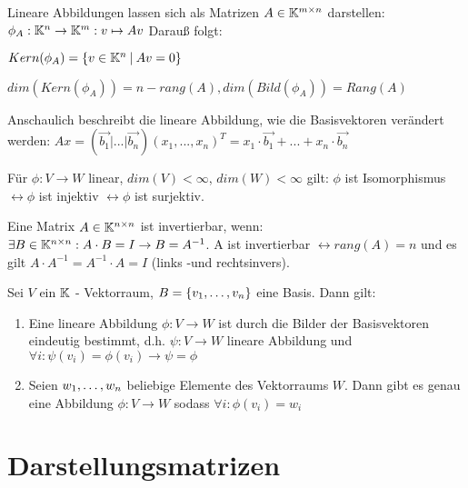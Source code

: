 \begin{definition}
	Lineare Abbildungen lassen sich als Matrizen $A \in \mathbb{K}^{m \times n}$ darstellen: $\phi_A : \mathbb{K}^n \rightarrow \mathbb{K}^m : v \mapsto Av$ Darauß folgt:
	\begin{description}[noitemsep]
		\item $Kern(\phi_A) = \{v \in \mathbb{K}^n \medspace | \medspace Av = 0\}$
		\item $dim(Kern(\phi_A)) = n - rang(A), dim(Bild(\phi_A)) = Rang(A)$
	\end{description}

	Anschaulich beschreibt die lineare Abbildung, wie die Basisvektoren verändert werden: $Ax = (\vec{b_1} |... | \vec{b_n}) (x_1, ..., x_n)^T = x_1 \cdot \vec{b_1} + ... + x_n \cdot \vec{b_n}  $
	
	Für $\phi : V \rightarrow W$ linear, $dim(V) < \infty$, $dim(W) < \infty$ gilt: $\phi$ ist Isomorphismus $\leftrightarrow \phi$ ist injektiv $\leftrightarrow \phi$ ist surjektiv.
\end{definition}


\begin{satz}
	Eine Matrix $A \in \mathbb{K}^{n \times n}$ ist invertierbar, wenn: $\exists B \in \mathbb{K}^{n \times n} : A \cdot B = I \rightarrow B = A^{-1}$.  A ist invertierbar $\leftrightarrow rang(A) = n$ und es gilt $A \cdot A^{-1} = A^{-1} \cdot A = I$ (links -und rechtsinvers).
\end{satz}

\begin{satz}
	Sei $V$ ein $\mathbb{K}$ - Vektorraum, $B = \{v_1, \dots, v_n\}$ eine Basis. Dann gilt:
	\begin{enumerate}[noitemsep]
		\item Eine lineare Abbildung $\phi : V \rightarrow W$ ist durch die Bilder der Basisvektoren eindeutig bestimmt, d.h. $\psi : V \rightarrow W$ lineare Abbildung und  $\forall i : \psi(v_i) = \phi(v_i) \rightarrow \psi = \phi $
		\item Seien $w_1, \dots, w_n$ beliebige Elemente des Vektorraums $W$. Dann gibt es genau eine Abbildung $\phi : V \rightarrow W$ sodass $\forall i : \phi(v_i) = w_i$
	\end{enumerate} 
\end{satz}

\pagebreak

\section{Darstellungsmatrizen}

